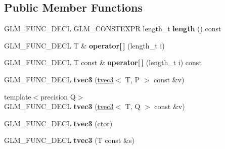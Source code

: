 \subsection*{Public Member Functions}
\begin{DoxyCompactItemize}
\item 
G\+L\+M\+\_\+\+F\+U\+N\+C\+\_\+\+D\+E\+CL G\+L\+M\+\_\+\+C\+O\+N\+S\+T\+E\+X\+PR length\+\_\+t {\bfseries length} () const \hypertarget{structglm_1_1detail_1_1tvec3_ab94f5ac7a44a25ff2f532b20763f0b1d}{}\label{structglm_1_1detail_1_1tvec3_ab94f5ac7a44a25ff2f532b20763f0b1d}

\item 
G\+L\+M\+\_\+\+F\+U\+N\+C\+\_\+\+D\+E\+CL T \& {\bfseries operator\mbox{[}$\,$\mbox{]}} (length\+\_\+t i)\hypertarget{structglm_1_1detail_1_1tvec3_a45e7f76041f4836b8855395fb8c6e244}{}\label{structglm_1_1detail_1_1tvec3_a45e7f76041f4836b8855395fb8c6e244}

\item 
G\+L\+M\+\_\+\+F\+U\+N\+C\+\_\+\+D\+E\+CL T const \& {\bfseries operator\mbox{[}$\,$\mbox{]}} (length\+\_\+t i) const \hypertarget{structglm_1_1detail_1_1tvec3_ac5a8ca23923813c57bf1526aa50f0f5b}{}\label{structglm_1_1detail_1_1tvec3_ac5a8ca23923813c57bf1526aa50f0f5b}

\item 
G\+L\+M\+\_\+\+F\+U\+N\+C\+\_\+\+D\+E\+CL {\bfseries tvec3} (\hyperlink{structglm_1_1detail_1_1tvec3}{tvec3}$<$ T, P $>$ const \&v)\hypertarget{structglm_1_1detail_1_1tvec3_a4f0be98873dfb6134d369f817dcb9478}{}\label{structglm_1_1detail_1_1tvec3_a4f0be98873dfb6134d369f817dcb9478}

\item 
{\footnotesize template$<$precision Q$>$ }\\G\+L\+M\+\_\+\+F\+U\+N\+C\+\_\+\+D\+E\+CL {\bfseries tvec3} (\hyperlink{structglm_1_1detail_1_1tvec3}{tvec3}$<$ T, Q $>$ const \&v)\hypertarget{structglm_1_1detail_1_1tvec3_ae092787775d3e74cf242744892eb3923}{}\label{structglm_1_1detail_1_1tvec3_ae092787775d3e74cf242744892eb3923}

\item 
G\+L\+M\+\_\+\+F\+U\+N\+C\+\_\+\+D\+E\+CL {\bfseries tvec3} (ctor)\hypertarget{structglm_1_1detail_1_1tvec3_a5c1bc887c279d54e39c038c1f201e60b}{}\label{structglm_1_1detail_1_1tvec3_a5c1bc887c279d54e39c038c1f201e60b}

\item 
G\+L\+M\+\_\+\+F\+U\+N\+C\+\_\+\+D\+E\+CL {\bfseries tvec3} (T const \&s)\hypertarget{structglm_1_1detail_1_1tvec3_a2a9b1dc81918af347e4726ee1666d5de}{}\label{structglm_1_1detail_1_1tvec3_a2a9b1dc81918af347e4726ee1666d5de}


\end{DoxyCompactItemize}

